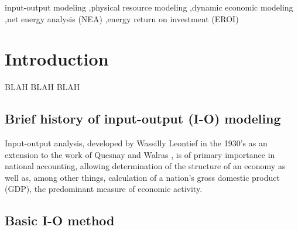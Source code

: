 \documentclass[authoryear,preprint,review,12pt]{elsarticle}
\begin{document}
\begin{frontmatter}
\begin{abstract}
\end{abstract}

\begin{keyword}

input-output modeling \sep physical resource modeling \sep dynamic economic modeling \sep net energy analysis (NEA) \sep energy return on investment (EROI)



\end{keyword}

\end{frontmatter}

\linenumbers


\newpage
\tableofcontents

\section{Introduction}

BLAH BLAH BLAH

\subsection{Brief history of input-output (I-O) modeling}

Input-output analysis, developed by Wassilly Leontief in the 1930's as an extension to the work of Quesnay and Walras \cite{Leontief1936}, is of primary importance in national accounting, allowing determination of the structure of an economy as well as, among other things, calculation of a nation's gross domestic product (GDP), the predominant measure of economic activity.

\subsection{Basic I-O method}
\end{document}
